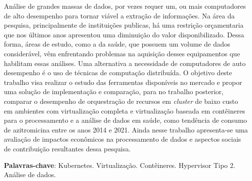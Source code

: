 
\begin{resumo}
    Análise de grandes massas de dados, por vezes requer um, ou mais computadores de alto desempenho para tornar viável a extração de informações. Na área da pesquisa, principalmente de instituições publicas, há uma restrição orçamentaria que nos últimos anos apresentou uma diminuição do valor disponibilizado. Dessa forma, áreas de estudo, como a da saúde, que possuem um volume de dados considerável, vêm enfrentando problemas na aquisição desses equipamentos que habilitam essas análises. Uma alternativa a necessidade de computadores de auto desempenho é o uso de técnicas de computação distribuída. O objetivo deste trabalho visa realizar o estudo das ferramentas disponíveis no mercado e propor uma solução de implementação e comparação, para no trabalho posterior, comparar o desempenho de orquestração de recursos em \emph{cluster} de baixo custo em ambientes com virtualização completa e virtualização baseada em contêineres para o processamento e a análise de dados em saúde, como tendência de consumo de azitromicina entre os anos 2014 e 2021. Ainda nesse trabalho apresenta-se uma avaliação de impactos econômicos na processamento de dados e aspectos sociais de contribuição resultantes dessa pesquisa.

    \textbf{Palavras-chave}: Kubernetes\textregistered. Virtualização. Contêineres. Hypervisor Tipo 2. Análise de dados.
\end{resumo}

